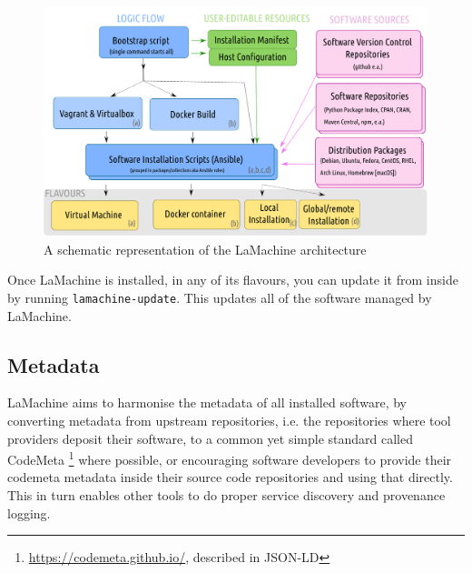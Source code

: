 \documentclass[a4paper,11pt]{article}
\begin{document}
%

\begin{figure}[htb] \begin{center}
\includegraphics[width=135.0mm]{architecture.png}
\end{center}
\caption{\footnotesize{A schematic representation of the LaMachine architecture}}
\label{fig:arch}
\end{figure}

Once LaMachine is installed, in any of its flavours, you can update it from inside by running
\texttt{lamachine-update}. This updates all of the software managed by LaMachine.

\subsection{Metadata}
\label{sec:metadata}

LaMachine aims to harmonise the metadata of all installed software, by converting metadata from upstream repositories,
i.e. the repositories where tool providers deposit their software, to a common yet simple standard called CodeMeta
\footnote{\url{https://codemeta.github.io/}, described in JSON-LD} \cite{codemeta,codemetar} where possible, or
encouraging software developers to provide their codemeta metadata inside their source code repositories and using that
directly. This in turn enables other tools to do proper service discovery and provenance logging.
\end{document}
